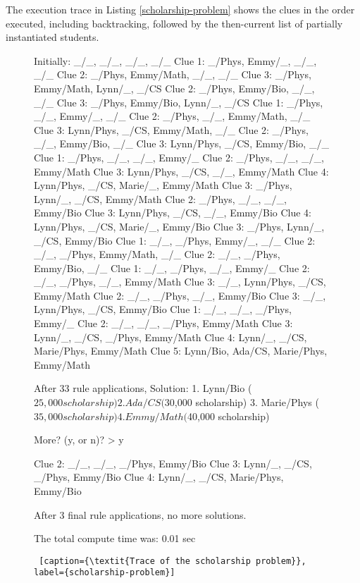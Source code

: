 The execution trace in Listing \ref{scholarship-problem} shows the clues in the order executed, including backtracking, followed by the then-current list of partially instantiated students.

\begin{figure}[ht]
    \flushright
\begin{minipage}[c]{0.45\textwidth}
\begin{python1}
Initially: _/_, _/_, _/_, _/_
Clue 1: _/Phys, Emmy/_, _/_, _/_
Clue 2: _/Phys, Emmy/Math, _/_, _/_
Clue 3: _/Phys, Emmy/Math, Lynn/_, _/CS
Clue 2: _/Phys, Emmy/Bio, _/_, _/_
Clue 3: _/Phys, Emmy/Bio, Lynn/_, _/CS
Clue 1: _/Phys, _/_, Emmy/_, _/_
Clue 2: _/Phys, _/_, Emmy/Math, _/_
Clue 3: Lynn/Phys, _/CS, Emmy/Math, _/_
Clue 2: _/Phys, _/_, Emmy/Bio, _/_
Clue 3: Lynn/Phys, _/CS, Emmy/Bio, _/_
Clue 1: _/Phys, _/_, _/_, Emmy/_
Clue 2: _/Phys, _/_, _/_, Emmy/Math
Clue 3: Lynn/Phys, _/CS, _/_, Emmy/Math
Clue 4: Lynn/Phys, _/CS, Marie/_, Emmy/Math
Clue 3: _/Phys, Lynn/_, _/CS, Emmy/Math
Clue 2: _/Phys, _/_, _/_, Emmy/Bio
Clue 3: Lynn/Phys, _/CS, _/_, Emmy/Bio
Clue 4: Lynn/Phys, _/CS, Marie/_, Emmy/Bio
Clue 3: _/Phys, Lynn/_, _/CS, Emmy/Bio
Clue 1: _/_, _/Phys, Emmy/_, _/_
Clue 2: _/_, _/Phys, Emmy/Math, _/_
Clue 2: _/_, _/Phys, Emmy/Bio, _/_
Clue 1: _/_, _/Phys, _/_, Emmy/_
Clue 2: _/_, _/Phys, _/_, Emmy/Math
Clue 3: _/_, Lynn/Phys, _/CS, Emmy/Math
Clue 2: _/_, _/Phys, _/_, Emmy/Bio
Clue 3: _/_, Lynn/Phys, _/CS, Emmy/Bio
Clue 1: _/_, _/_, _/Phys, Emmy/_
Clue 2: _/_, _/_, _/Phys, Emmy/Math
Clue 3: Lynn/_, _/CS, _/Phys, Emmy/Math
Clue 4: Lynn/_, _/CS, Marie/Phys, Emmy/Math
Clue 5: Lynn/Bio, Ada/CS, Marie/Phys, Emmy/Math

After 33 rule applications,
Solution: 
	1. Lynn/Bio	($25,000 scholarship)
	2. Ada/CS	($30,000 scholarship)
	3. Marie/Phys	($35,000 scholarship)
	4. Emmy/Math	($40,000 scholarship)

More? (y, or n)? > y

Clue 2: _/_, _/_, _/Phys, Emmy/Bio
Clue 3: Lynn/_, _/CS, _/Phys, Emmy/Bio
Clue 4: Lynn/_, _/CS, Marie/Phys, Emmy/Bio

After 3 final rule applications, no more solutions.

The total compute time was: 0.01 sec
\end{python1}\linv
\begin{lstlisting} [caption={\textit{Trace of the scholarship problem}},  label={scholarship-problem}]
\end{lstlisting}
\end{minipage}
\end{figure}


